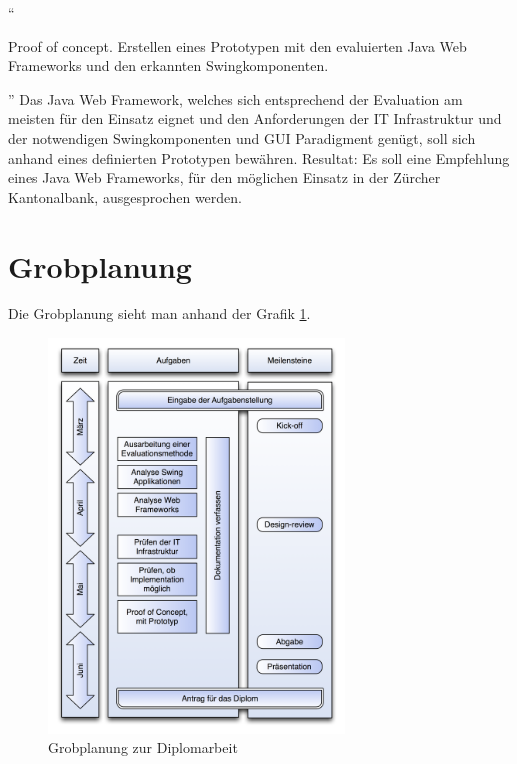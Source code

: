   ``\begin{itshape}Proof of concept. Erstellen eines Prototypen mit den
  evaluierten Java Web Frameworks und den erkannten
  Swingkomponenten.\end{itshape}''
  \newline
  \newline
  \noindent
  Das Java Web Framework, welches sich entsprechend der Evaluation am meisten
  für den Einsatz eignet und den Anforderungen der IT Infrastruktur und der
  notwendigen Swingkomponenten und GUI Paradigment genügt, soll sich anhand
  eines definierten Prototypen bewähren.
  \newline
  \newline
  \noindent
  Resultat: Es soll eine Empfehlung eines Java Web Frameworks, für den
  möglichen Einsatz in der Zürcher Kantonalbank, ausgesprochen werden.
  
  \section{Grobplanung}
  
  Die Grobplanung sieht man anhand der Grafik \ref{img:grobplanung}.
  
  \begin{figure}[h]
    \begin{center}
      \includegraphics[width=0.7\textwidth]{./image/grobplanung.png}
      \caption{Grobplanung zur Diplomarbeit}
      \label{img:grobplanung}
    \end{center}
  \end{figure}
  
